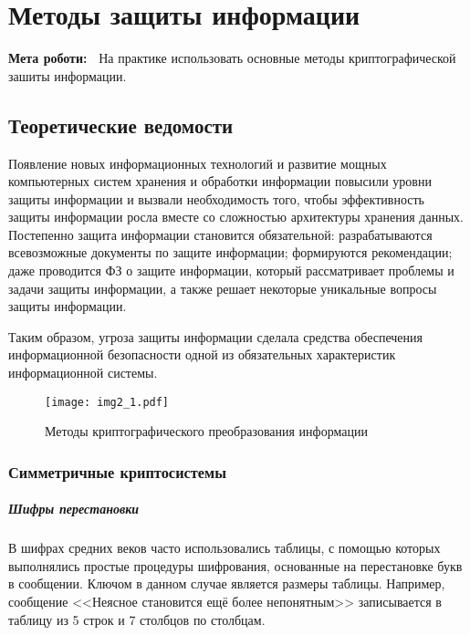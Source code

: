 \chapter{Методы защиты информации} \label{chapt2}%
\textbf{Мета роботи:~}%
На практике использовать основные методы криптографической зашиты информации.
\section{Теоретические ведомости} \label{sect8_a}
%
Появление новых информационных технологий и развитие мощных компьютерных
систем хранения и обработки информации повысили уровни защиты информации и
вызвали необходимость того, чтобы эффективность защиты информации росла
вместе со сложностью архитектуры хранения данных. Постепенно защита
информации становится обязательной: разрабатываются всевозможные документы по
защите информации; формируются рекомендации; даже проводится ФЗ о защите
информации, который рассматривает проблемы и задачи защиты информации, а
также решает некоторые уникальные вопросы защиты информации.

Таким образом, угроза защиты информации сделала средства обеспечения
информационной безопасности одной из обязательных характеристик
информационной системы.

\begin{figure}[h]
  \centering
  \texttt{[image: img2\_1.pdf]}
  \caption{Методы криптографического преобразования информации}\label{img2x1}
\end{figure}



\subsection{Симметричные криптосистемы}
\paragraph{Шифры перестановки} В шифрах средних веков часто использовались
таблицы, с помощью которых выполнялись простые процедуры шифрования,
основанные на перестановке букв в сообщении. Ключом в данном случае является
размеры таблицы. Например, сообщение <<Неясное становится ещё более
непонятным>> записывается в таблицу из 5 строк и 7 столбцов по столбцам.

